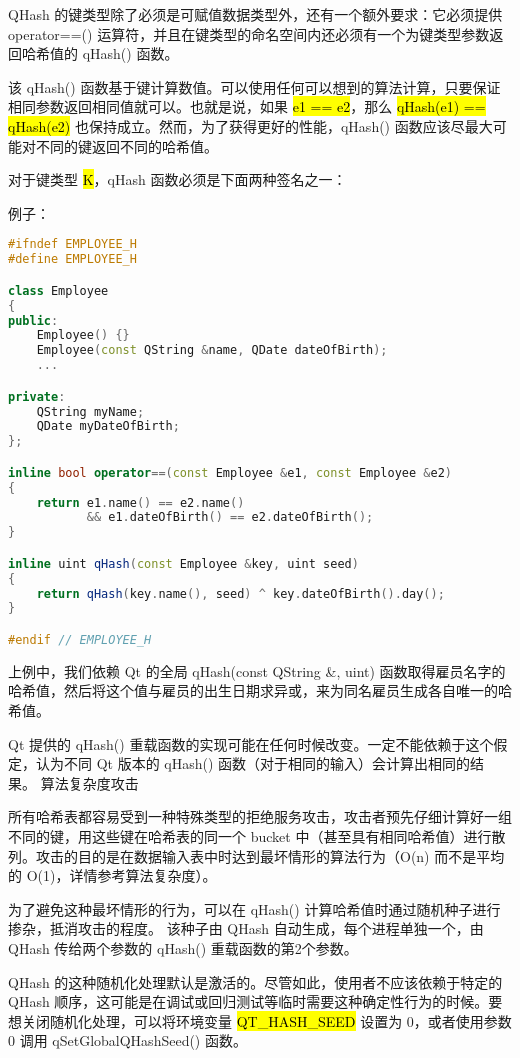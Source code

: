 QHash 的键类型除了必须是可赋值数据类型外，还有一个额外要求：它必须提供 operator==() 运算符，并且在键类型的命名空间内还必须有一个为键类型参数返回哈希值的 qHash() 函数。

该 qHash() 函数基于键计算数值。可以使用任何可以想到的算法计算，只要保证相同参数返回相同值就可以。也就是说，如果 \hl{e1 == e2}，那么 \hl{qHash(e1) == qHash(e2)} 也保持成立。然而，为了获得更好的性能，qHash() 函数应该尽最大可能对不同的键返回不同的哈希值。

对于键类型 \hl{K}，qHash 函数必须是下面两种签名之一：


例子：

\begin{lstlisting}[language=C++]
#ifndef EMPLOYEE_H
#define EMPLOYEE_H

class Employee
{
public:
    Employee() {}
    Employee(const QString &name, QDate dateOfBirth);
    ...

private:
    QString myName;
    QDate myDateOfBirth;
};

inline bool operator==(const Employee &e1, const Employee &e2)
{
    return e1.name() == e2.name()
           && e1.dateOfBirth() == e2.dateOfBirth();
}

inline uint qHash(const Employee &key, uint seed)
{
    return qHash(key.name(), seed) ^ key.dateOfBirth().day();
}

#endif // EMPLOYEE_H
\end{lstlisting}

上例中，我们依赖 Qt 的全局 qHash(const QString \&, uint) 函数取得雇员名字的哈希值，然后将这个值与雇员的出生日期求异或，来为同名雇员生成各自唯一的哈希值。

\begin{notice}
Qt 提供的 qHash() 重载函数的实现可能在任何时候改变。一定不能依赖于这个假定，认为不同 Qt 版本的 qHash() 函数（对于相同的输入）会计算出相同的结果。
算法复杂度攻击
\end{notice}

所有哈希表都容易受到一种特殊类型的拒绝服务攻击，攻击者预先仔细计算好一组不同的键，用这些键在哈希表的同一个 bucket 中（甚至具有相同哈希值）进行散列。攻击的目的是在数据输入表中时达到最坏情形的算法行为（O(n) 而不是平均的 O(1)，详情参考算法复杂度）。

为了避免这种最坏情形的行为，可以在 qHash() 计算哈希值时通过随机种子进行掺杂，抵消攻击的程度。 该种子由 QHash 自动生成，每个进程单独一个，由 QHash 传给两个参数的 qHash() 重载函数的第2个参数。

QHash 的这种随机化处理默认是激活的。尽管如此，使用者不应该依赖于特定的 QHash 顺序，这可能是在调试或回归测试等临时需要这种确定性行为的时候。要想关闭随机化处理，可以将环境变量 \hl{QT\_HASH\_SEED} 设置为 0，或者使用参数 0 调用 qSetGlobalQHashSeed() 函数。

